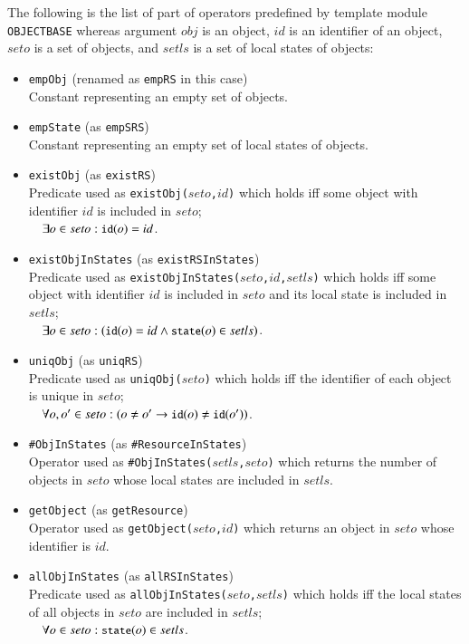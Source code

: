 \documentclass[12pt]{report}
\newcommand{\ra}{\rightarrow}
\newcommand{\mbstt}[1]{\mbox{\small{\tt {#1}}}}
\newcommand{\stt}[1]{{\small{\tt {#1}}}}
\begin{document}
The following is the list of part of operators predefined by
template module {\tt OBJECTBASE} whereas argument $obj$ is an object,
$id$ is an identifier of an object, $seto$ is a set of objects, and
$setls$ is a set of local states of objects:
\begin{itemize}
\item \stt{empObj} (renamed as \stt{empRS} in this case)\\
  Constant representing an empty set of objects.
\item \stt{empState} (as \stt{empSRS})\\
  Constant representing an empty set of local states of objects.
\item \stt{existObj} (as \stt{existRS})\\ 
  Predicate used as \stt{existObj($seto$,$id$)} which holds iff some
  object with identifier $id$ is included in $seto$;\\$~~~~\exists o\in
  seto: \mbstt{id}(o)=id$.
\item \stt{existObjInStates} (as \stt{existRSInStates})\\
  Predicate used as \stt{existObjInStates($seto$,$id$,$setls$)} which
  holds iff some object with identifier $id$ is included in $seto$ and
  its local state is included in $setls$;\\$~~~~\exists o\in seto:
  (\mbstt{id}(o)=id \land \mbstt{state}(o)\in setls)$.
\item \stt{uniqObj} (as \stt{uniqRS})\\
  Predicate used as \stt{uniqObj($seto$)} which holds iff the
  identifier of each object is unique in $seto$;\\$~~~~\forall o,o'\in
  seto:(o\ne o'\ra\mbstt{id}(o)\ne\mbstt{id}(o'))$.
\item \stt{\#ObjInStates} (as \stt{\#ResourceInStates})\\ 
  Operator used as \stt{\#ObjInStates($setls$,$seto$)} which returns
  the number of objects in $seto$ whose local states are
  included in $setls$.
\item \stt{getObject} (as \stt{getResource})\\ 
  Operator used as \stt{getObject($seto$,$id$)} which returns an
  object in $seto$ whose identifier is $id$.
\item \stt{allObjInStates} (as \stt{allRSInStates})\\
  Predicate used as \stt{allObjInStates($seto$,$setls$)} which holds iff
  the local states of all objects in $seto$ are included
  in $setls$;\\$~~~~\forall o\in seto:\mbstt{state}(o)\in setls$.

\end{itemize}
\end{document}
